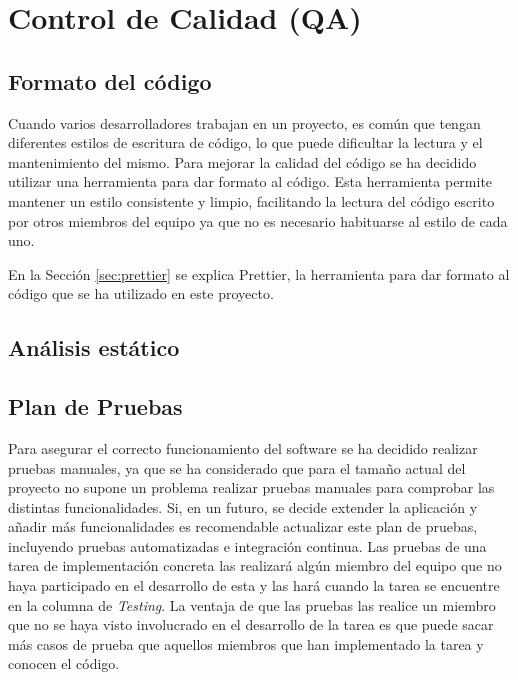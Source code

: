 \section{Control de Calidad (QA)}
\label{sec:qa}

\subsection{Formato del código}
Cuando varios desarrolladores trabajan en un proyecto, es común que tengan diferentes estilos de escritura de código, lo que puede dificultar la lectura y el mantenimiento del mismo. Para mejorar la calidad del código se ha decidido utilizar una herramienta para dar formato al código. Esta herramienta permite mantener un estilo consistente y limpio, facilitando la lectura del código escrito por otros miembros del equipo ya que no es necesario habituarse al estilo de cada uno.

En la Sección \ref{sec:prettier} se explica Prettier, la herramienta para dar formato al código que se ha utilizado en este proyecto.

\subsection{Análisis estático}

\subsection{Plan de Pruebas}
\label{sec:pruebas}

Para asegurar el correcto funcionamiento del software se ha decidido realizar pruebas manuales, ya que se ha considerado que para el tamaño actual del proyecto no supone un problema realizar pruebas manuales para comprobar las distintas funcionalidades. Si, en un futuro, se decide extender la aplicación y añadir más funcionalidades es recomendable actualizar este plan de pruebas, incluyendo pruebas automatizadas e integración continua. Las pruebas de una tarea de implementación concreta las realizará algún miembro del equipo que no haya participado en el desarrollo de esta y las hará cuando la tarea se encuentre en la columna de \textit{Testing}. La ventaja de que las pruebas las realice un miembro que no se haya visto involucrado en el desarrollo de la tarea es que puede sacar más casos de prueba que aquellos miembros que han implementado la tarea y conocen el código.

